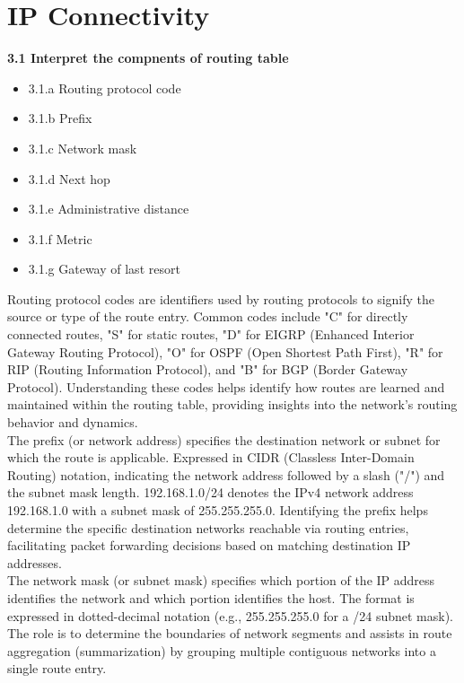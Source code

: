 \documentclass{article}
\begin{document}
\section{IP Connectivity}
\noindent\textbf{3.1 Interpret the compnents of routing table}
\begin{itemize}
\item 3.1.a Routing protocol code
\item 3.1.b Prefix
\item 3.1.c Network mask
\item 3.1.d Next hop
\item 3.1.e Administrative distance
\item 3.1.f Metric
\item 3.1.g Gateway of last resort
\end{itemize}

	Routing protocol codes are identifiers used by routing protocols to signify the source or type of the route entry. Common codes include "C" for directly connected routes, "S" for static routes, "D" for EIGRP (Enhanced Interior Gateway Routing Protocol), "O" for OSPF (Open Shortest Path First), "R" for RIP (Routing Information Protocol), and "B" for BGP (Border Gateway Protocol). Understanding these codes helps identify how routes are learned and maintained within the routing table, providing insights into the network's routing behavior and dynamics.\\
	
	The prefix (or network address) specifies the destination network or subnet for which the route is applicable. Expressed in CIDR (Classless Inter-Domain Routing) notation, indicating the network address followed by a slash ("/") and the subnet mask length. 192.168.1.0/24 denotes the IPv4 network address 192.168.1.0 with a subnet mask of 255.255.255.0. Identifying the prefix helps determine the specific destination networks reachable via routing entries, facilitating packet forwarding decisions based on matching destination IP addresses.\\
	
	The network mask (or subnet mask) specifies which portion of the IP address identifies the network and which portion identifies the host. The format is expressed in dotted-decimal notation (e.g., 255.255.255.0 for a /24 subnet mask). The role is to determine the boundaries of network segments and assists in route aggregation (summarization) by grouping multiple contiguous networks into a single route entry.\\
	
\end{document}
